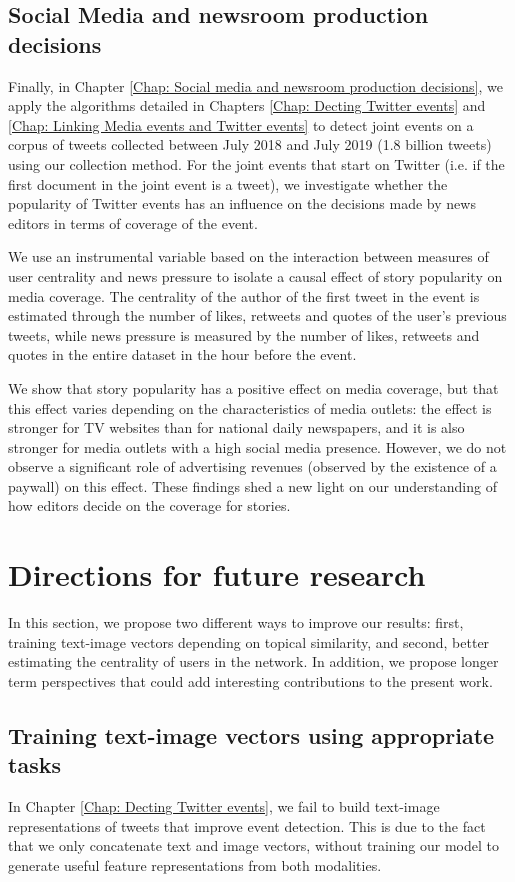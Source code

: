 \subsection{Social Media and newsroom production decisions}
Finally, in Chapter \ref{Chap: Social media and newsroom production decisions}, we apply the algorithms detailed in Chapters \ref{Chap: Decting Twitter events} and \ref{Chap: Linking Media events and Twitter events} to detect joint events on a corpus of tweets collected between July 2018 and July 2019 (1.8 billion tweets) using our collection method. For the joint events that start on Twitter (i.e. if the first document in the joint event is a tweet), we investigate whether the popularity of Twitter events has an influence on the decisions made by news editors in terms of coverage of the event.

We use an instrumental variable based on the interaction between measures of user centrality and news pressure to isolate a causal effect of story popularity on media coverage. The centrality of the author of the first tweet in the event is estimated through the number of likes, retweets and quotes of the user's previous tweets, while news pressure is measured by the number of likes, retweets and quotes in the entire dataset in the hour before the event.

We show that story popularity has a positive effect on media coverage, but that this effect varies depending on the characteristics of media outlets: the effect is stronger for TV websites than for national daily newspapers, and it is also stronger for media outlets with a high social media presence. However, we do not observe a significant role of advertising revenues (observed by the existence of a paywall) on this effect. These findings shed a new light on our understanding of how editors decide on the coverage for stories.

\section{Directions for future research}
In this section, we propose two different ways to improve our results: first, training text-image vectors depending on topical similarity, and second, better estimating the centrality of users in the network.
In addition, we propose longer term perspectives that could add interesting contributions to the present work.

\subsection{Training text-image vectors using appropriate tasks}
In Chapter \ref{Chap: Decting Twitter events}, we fail to build text-image representations of tweets that improve event detection. This is due to the fact that we only concatenate text and image vectors, without training our model to generate useful feature representations from both modalities. 

